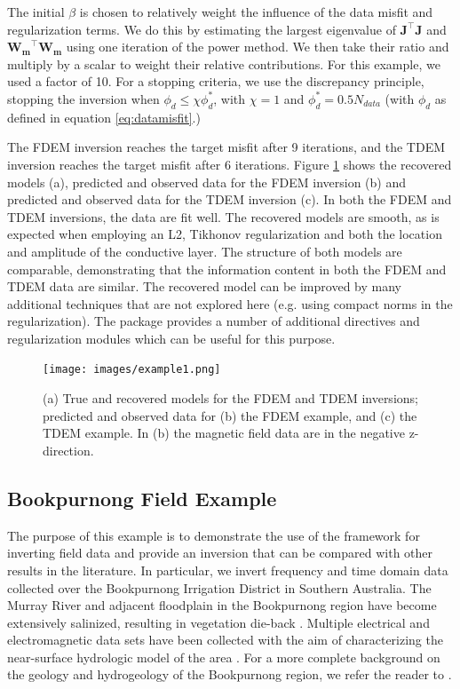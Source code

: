 The initial $\beta$ is chosen to relatively weight the influence of the data
misfit and regularization terms. We do this by estimating the largest
eigenvalue of $\mathbf{J}^{\top}\mathbf{J}$ and
$\mathbf{W_m}^{\top}\mathbf{W_m}$ using one iteration of the power method.
We then take their ratio and multiply by a scalar to weight their relative
contributions. For this example, we used a factor of 10. For a stopping
criteria, we use the discrepancy principle, stopping the inversion when
$\phi_d \leq \chi \phi_d^*$, with $\chi = 1$ and $\phi_d^* = 0.5 N_{data}$
(with $\phi_d$ as defined in equation \ref{eq:datamisfit}.)

The FDEM inversion reaches the target misfit after 9 iterations, and the TDEM
inversion reaches the target misfit after 6 iterations.  Figure
\ref{fig:example1Results} shows the recovered models (a), predicted and
observed data for the FDEM inversion (b) and predicted and observed data for
the TDEM inversion (c). In both the FDEM and TDEM inversions, the data are fit
well. The recovered models are smooth, as is expected when employing an L2,
Tikhonov regularization and both the location and amplitude of the
conductive layer. The structure of both models are comparable, demonstrating
that the information content in both the FDEM and TDEM data are similar. The
recovered model can be improved by many additional techniques that are not
explored here (e.g. using compact norms in the regularization). The \SimPEG
package provides a number of additional directives and regularization modules
which can be useful for this purpose.


{%
\begin{figure}[htb!]
    \centering
    \texttt{[image: images/example1.png]}
\caption{(a) True and recovered models for the FDEM and TDEM inversions; predicted and observed data for (b) the FDEM example, and (c) the TDEM example. In (b) the magnetic field data are in the negative z-direction.}
\label{fig:example1Results}
\end{figure}
}


\subsection{Bookpurnong Field Example}
\label{sec:BookpurnongFieldExample}

The purpose of this example is to demonstrate the use of the framework for
inverting field data and provide an inversion that can be compared with other
results in the literature. In particular, we invert frequency and time domain
data collected over the Bookpurnong Irrigation District in Southern Australia.
The Murray River and adjacent floodplain in the Bookpurnong region have become
extensively salinized, resulting in vegetation die-back \citep{Munday2006,
Overton2004}. Multiple electrical and electromagnetic data sets have been
collected with the aim of characterizing the near-surface hydrologic model of
the area \citep{Munday2006}. For a more complete background on the geology and
hydrogeology of the Bookpurnong region, we refer the reader to
\cite{Munday2006}.

